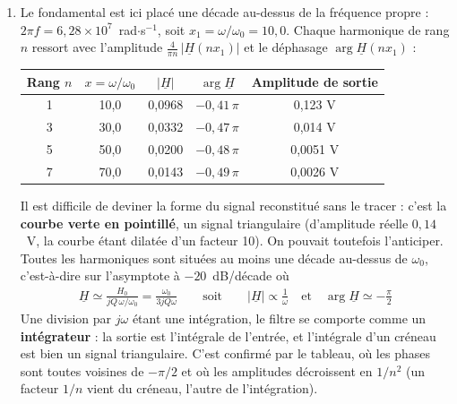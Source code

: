 \begin{correction}
\begin{enumerate}
	\item Le fondamental est ici placé une décade au-dessus de la fréquence propre : $2\pi f=6,28\times10^{7}$~rad$\cdot$s$^{-1}$, soit $x_1=\omega/\omega_0=10,0$. Chaque harmonique de rang $n$ ressort avec l'amplitude $\frac{4}{\pi n}\,|\underline{H}(nx_1)|$ et le déphasage $\arg\underline{H}(nx_1)$ :

	\begin{center}
	\begin{tabular}{|c|c|c|c|c|}
        \hline
        Rang $n$ & $x=\omega/\omega_0$ & $|\underline{H}|$ & $\arg\underline{H}$ & Amplitude de sortie \\
        \hline
        1 & 10,0 & 0,0968 & $-0,41\,\pi$ & 0,123 V \\
        \hline
        3 & 30,0 & 0,0332 & $-0,47\,\pi$ & 0,014 V \\
        \hline
        5 & 50,0 & 0,0200 & $-0,48\,\pi$ & 0,0051 V \\
        \hline
        7 & 70,0 & 0,0143 & $-0,49\,\pi$ & 0,0026 V \\
        \hline
	\end{tabular}
	\end{center}

	Il est difficile de deviner la forme du signal reconstitué sans le tracer : c'est la \textbf{courbe verte en pointillé}, un signal triangulaire (d'amplitude réelle $0,14$~V, la courbe étant dilatée d'un facteur 10). On pouvait toutefois l'anticiper. Toutes les harmoniques sont situées au moins une décade au-dessus de $\omega_0$, c'est-à-dire sur l'asymptote à $-20$~dB/décade où
	\begin{align*}
		\underline{H}\simeq\frac{H_0}{jQ\,\omega/\omega_0}=\frac{\omega_0}{3jQ\omega}\qquad\text{soit}\qquad |\underline{H}|\propto\frac{1}{\omega}\quad\text{et}\quad\arg\underline{H}\simeq-\frac{\pi}{2}
	\end{align*}
	Une division par $j\omega$ étant une intégration, le filtre se comporte comme un \textbf{intégrateur} : la sortie est l'intégrale de l'entrée, et l'intégrale d'un créneau est bien un signal triangulaire. C'est confirmé par le tableau, où les phases sont toutes voisines de $-\pi/2$ et où les amplitudes décroissent en $1/n^2$ (un facteur $1/n$ vient du créneau, l'autre de l'intégration).


\end{enumerate}
\end{correction}
